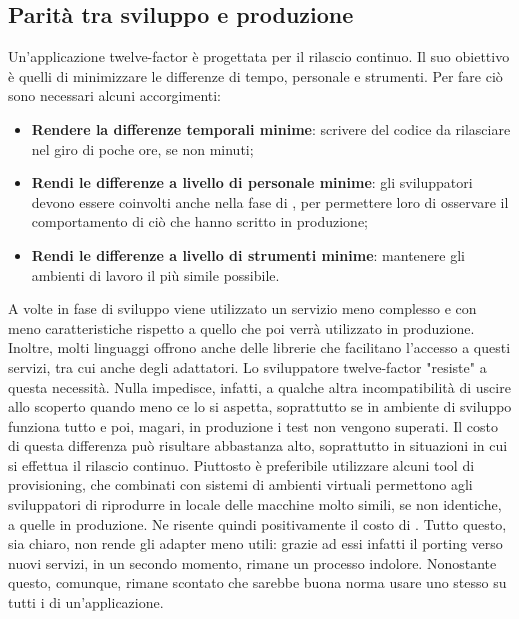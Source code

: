 \documentclass[NormeDiProgetto.tex]{subfiles}
\begin{document}
\subsection{Parità tra sviluppo e produzione}
Un'applicazione twelve-factor è progettata per il rilascio continuo. Il suo obiettivo è quelli di minimizzare le differenze di tempo, personale e strumenti.
Per fare ciò sono necessari alcuni accorgimenti:
\begin{itemize}
\item \textbf{Rendere la differenze temporali minime}: scrivere del codice da rilasciare nel giro di poche ore, se non minuti;
\item \textbf{Rendi le differenze a livello di personale minime}: gli sviluppatori devono essere coinvolti anche nella fase di , per permettere loro di osservare il comportamento di ciò che hanno scritto in produzione;
\item \textbf{Rendi le differenze a livello di strumenti minime}: mantenere gli ambienti di lavoro il più simile possibile.
\end{itemize}
A volte in fase di sviluppo viene utilizzato un servizio meno complesso e con meno caratteristiche rispetto a quello che poi verrà utilizzato in produzione. Inoltre, molti linguaggi offrono anche delle librerie che facilitano l'accesso a questi servizi, tra cui anche degli adattatori. Lo sviluppatore twelve-factor "resiste" a questa necessità. Nulla impedisce, infatti, a qualche altra incompatibilità di uscire allo scoperto quando meno ce lo si aspetta, soprattutto se in ambiente di sviluppo funziona tutto e poi, magari, in produzione i test non vengono superati. Il costo di questa differenza può risultare abbastanza alto, soprattutto in situazioni in cui si effettua il rilascio continuo.
Piuttosto è preferibile utilizzare alcuni tool di provisioning, che combinati con sistemi di ambienti virtuali permettono agli sviluppatori di riprodurre in locale delle macchine molto simili, se non identiche, a quelle in produzione. Ne risente quindi positivamente il costo di .
Tutto questo, sia chiaro, non rende gli adapter meno utili: grazie ad essi infatti il porting verso nuovi servizi, in un secondo momento, rimane un processo indolore. Nonostante questo, comunque, rimane scontato che sarebbe buona norma usare uno stesso  su tutti i  di un'applicazione.
\end{document}
